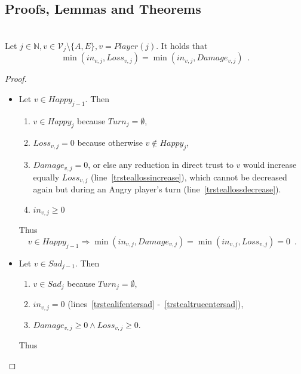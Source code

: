 \documentclass[11pt]{llncs}
\theoremstyle{definition}
\begin{document}
    \subsection{Proofs, Lemmas and Theorems}
    \begin{lemma} \ \\
       Let $j \in \mathbb{N}, v \in \mathcal{V}_j \setminus \{A, E\}, v = Player\left(j\right)$. It holds that
       \begin{equation}
          \min\left(in_{v, j}, Loss_{v, j}\right) = \min\left(in_{v, j}, Damage_{v, j}\right) \enspace.
       \end{equation}
    \end{lemma}
    \begin{proof}
       \begin{itemize}
          \item Let $v \in Happy_{j-1}$. Then
          \begin{enumerate}
             \item $v \in Happy_j$ because $Turn_{j} = \emptyset$,
             \item $Loss_{v, j} = 0$ because otherwise $v \notin Happy_j$,
             \item $Damage_{v, j} = 0$, or else any reduction in direct trust to $v$ would increase equally
             $Loss_{v, j}$ (line~\ref{trsteallossincrease}), which cannot be decreased again but during an Angry player's turn
             (line~\ref{trsteallossdecrease}).
             \item $in_{v, j} \geq 0$
          \end{enumerate}
          Thus
          \begin{equation}
             v \in Happy_{j-1} \Rightarrow \min\left(in_{v, j}, Damage_{v,j}\right) = \min\left(in_{v, j}, Loss_{v,j}\right)
             = 0 \enspace.
          \end{equation}
          \item Let $v \in Sad_{j-1}$. Then
          \begin{enumerate}
             \item $v \in Sad_j$ because $Turn_{j} = \emptyset$, 
             \item $in_{v, j} = 0$ (lines~\ref{trstealifentersad} -~\ref{trstealtrueentersad}),
             \item $Damage_{v, j} \geq 0 \wedge Loss_{v, j} \geq 0$.
          \end{enumerate}
          Thus
          \begin{equation}

\end{equation}
\end{itemize}
\end{proof}
\end{document}
